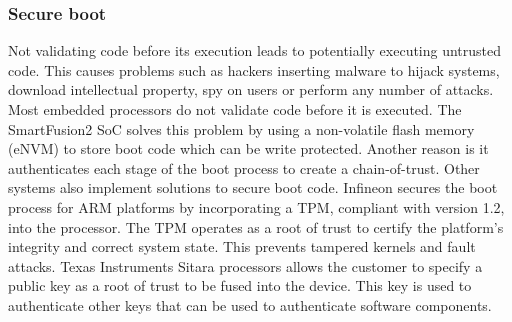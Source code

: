 \subsubsection*{Secure boot}
Not validating code before its execution leads to potentially executing untrusted code. This causes problems such as hackers inserting malware to hijack systems, download intellectual property, spy on users or perform any number of attacks.
Most embedded processors do not validate code before it is executed. The SmartFusion2 \ac{SoC} solves this problem by using a non-volatile flash memory (eNVM) to store boot code which can be write protected. Another reason is it authenticates each stage of the boot process to create a chain-of-trust.
Other systems also implement solutions to secure boot code. Infineon secures the boot process for ARM platforms by incorporating a \ac{TPM}, compliant with version 1.2, into the processor. The \ac{TPM} operates as a root of trust to certify the platform's integrity and correct system state. This prevents tampered kernels and fault attacks.
Texas Instruments Sitara processors allows the customer to specify a public key as a root of trust to be fused into the device. This key is used to authenticate other keys that can be used to authenticate software components.

